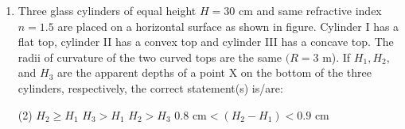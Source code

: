 
\begin{enumerate}
    \item Three glass cylinders of equal height \( H = 30 \) cm and same refractive index \( n=1.5 \) are placed on a horizontal surface as shown in figure. Cylinder I has a flat top, cylinder II has a convex top and cylinder III has a concave top. The radii of curvature of the two curved tops are the same \( (R = 3 \) m). If \( H_1, H_2, \) and \( H_3 \) are the apparent depths of a point X on the bottom of the three cylinders, respectively, the correct statement(s) is/are:
        \begin{center}
        \end{center}
        \begin{tasks}(2)
            \task \( H_2 \geq H_1 \)
            \task \( H_3 > H_1 \)
            \task \( H_2 > H_3 \)
            \task \( 0.8 \text{ cm} < (H_2 - H_1) < 0.9 \text{ cm} \)
        \end{tasks}
\end{enumerate}
